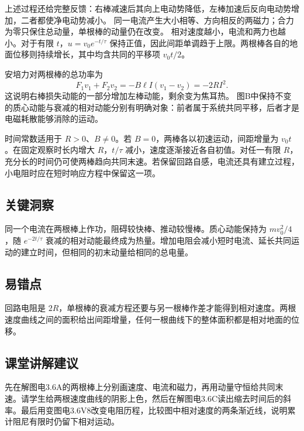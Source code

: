\documentclass[UTF8,fontset=fandol,a4paper,11pt]{ctexart}
\begin{document}
上述过程还给完整反馈：右棒减速后其向上电动势降低，左棒加速后反向电动势增加，二者都使净电动势减小。
同一电流产生大小相等、方向相反的两磁力；合力为零只保住总动量，单根棒的动量仍在改变。
相对速度越小，电流和两力也越小。对于有限 $t$，$u=v_0e^{-t/\tau}$ 保持正值，因此间距单调趋于上限。两根棒各自的地面位移则持续增长，其中均含共同的平移项 $v_0 t/2$。

安培力对两根棒的总功率为
\[
F_1v_1+F_2v_2=-B\ell I(v_1-v_2)=-2RI^2.
\]
这说明右棒损失动能的一部分增加左棒动能，剩余变为焦耳热。
图B中保持不变的质心动能与衰减的相对动能分别有明确对象：前者属于系统共同平移，后者才是电磁耗散能够消除的运动。

时间常数适用于 $R>0$、$B\ne0$。若 $B=0$，两棒各以初速运动，间距增量为 $v_0t$。在固定观察时长内增大 $R$，$t/\tau$ 减小，速度逐渐接近各自初值。对任一有限 $R$，充分长的时间仍可使两棒趋向共同末速。若保留回路自感，电流还具有建立过程，小电阻时应在短时响应方程中保留这一项。




\subsection*{关键洞察}

同一个电流在两根棒上作功，阻碍较快棒、推动较慢棒。质心动能保持为 $mv_0^2/4$，随 $e^{-2t/\tau}$ 衰减的相对动能最终成为热量。增加电阻会减小短时电流、延长共同运动的建立时间，但相同的初末动量给相同的总电量。



\subsection*{易错点}

回路电阻是 $2R$，单根棒的衰减方程还要与另一根棒作差才能得到相对速度。两根速度曲线之间的面积给出间距增量，任何一根曲线下的整体面积都是相对地面的位移。



\subsection*{课堂讲解建议}

先在解图电3.6A的两根棒上分别画速度、电流和磁力，再用动量守恒给共同末速。请学生给两根速度曲线的阴影上色，然后在解图电3.6C读出缩去时间后的斜率。最后用变图电3.6V8改变电阻历程，比较图中相对速度的两条渐近线，说明累计阻尼有限时仍留下相对运动。
\end{document}

